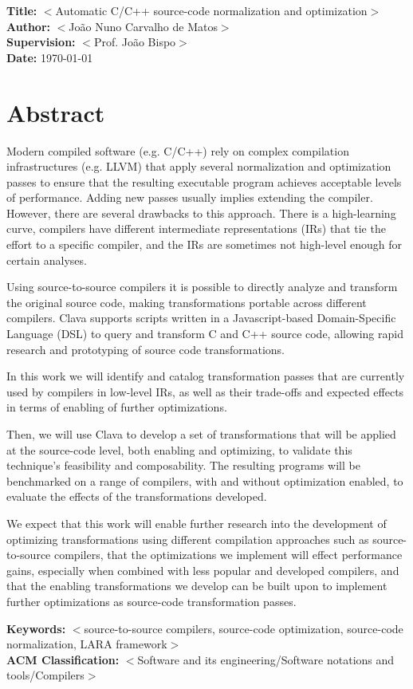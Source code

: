 \documentclass[11pt,a4paper]{article}
\newcommand{\dummy}[1]{$<$#1$>$}
\newcommand{\titles}[2]{\noindent\textbf{#1:} #2\\[2mm]}
\begin{document}
\titles{Title}{\dummy{Automatic C/C++ source-code normalization and optimization}}
\titles{Author}{\dummy{João Nuno Carvalho de Matos}}
\titles{Supervision}{\dummy{Prof. João Bispo}}
\titles{Date}{\today}

\section*{Abstract}

Modern compiled software (e.g. C/C++) rely on complex compilation infrastructures (e.g. LLVM\cite{Lattner2004}) that apply several normalization and optimization passes to ensure that the resulting executable program achieves acceptable levels of performance. 
Adding new passes usually implies extending the compiler. However, there are several drawbacks to this approach. There is a high-learning curve, compilers have different intermediate representations (IRs) that tie the effort to a specific compiler, and the IRs are sometimes not high-level enough for certain analyses.

Using source-to-source compilers it is possible to directly analyze and transform the original source code\cite{Arabnejad2018}\cite{Bae2013}, making transformations portable across different compilers.
Clava\cite{Bispo2020} supports scripts written in a Javascript-based Domain-Specific Language (DSL) to query and transform C and C++ source code, allowing rapid research and prototyping of source code transformations.

In this work we will identify and catalog transformation passes that are currently used by compilers in low-level IRs, as well as their trade-offs and expected effects in terms of enabling of further optimizations.

Then, we will use Clava to develop a set of transformations that will be applied at the source-code level, both enabling and optimizing, to validate this technique's feasibility and composability. The resulting programs will be benchmarked on a range of compilers, with and without optimization enabled, to evaluate the effects of the transformations developed.

We expect that this work will enable further research into the development of optimizing transformations using different compilation approaches such as source-to-source compilers, that the optimizations we implement will effect performance gains, especially when combined with less popular and developed compilers, and that the enabling transformations we develop can be built upon to implement further optimizations as source-code transformation passes.

\titles{Keywords}{\dummy{source-to-source compilers, source-code optimization, source-code normalization, LARA framework}}
\titles{ACM Classification}{\dummy{Software and its engineering/Software notations and tools/Compilers}}

\nocite{*}  %



\end{document}
